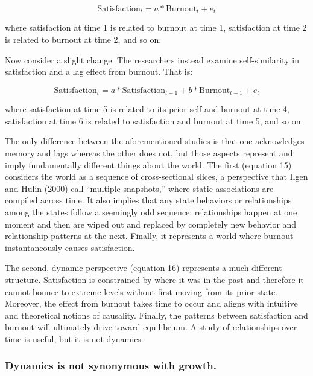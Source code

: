 \documentclass[english,,man]{apa6}
\begin{document}
\begin{equation}
\textrm{Satisfaction}_{t} = a * \textrm{Burnout}_{t} + e_{t}
\end{equation}

\noindent where satisfaction at time 1 is related to burnout at time 1, satisfaction at time 2 is related to burnout at time 2, and so on.

Now consider a slight change. The researchers instead examine self-similarity in satisfaction and a lag effect from burnout. That is:

\begin{equation}
\textrm{Satisfaction}_{t} = a * \textrm{Satisfaction}_{t - 1} + b * \textrm{Burnout}_{t - 1} + e_{t}
\end{equation}

\noindent where satisfaction at time 5 is related to its prior self and burnout at time 4, satisfaction at time 6 is related to satisfaction and burnout at time 5, and so on.

The only difference between the aforementioned studies is that one acknowledges memory and lags whereas the other does not, but those aspects represent and imply fundamentally different things about the world. The first (equation 15) considers the world as a sequence of cross-sectional slices, a perspective that Ilgen and Hulin (2000) call \enquote{multiple snapshots,} where static associations are compiled across time. It also implies that any state behaviors or relationships among the states follow a seemingly odd sequence: relationships happen at one moment and then are wiped out and replaced by completely new behavior and relationship patterns at the next. Finally, it represents a world where burnout instantaneously causes satisfaction.

The second, dynamic perspective (equation 16) represents a much different structure. Satisfaction is constrained by where it was in the past and therefore it cannot bounce to extreme levels without first moving from its prior state. Moreover, the effect from burnout takes time to occur and aligns with intuitive and theoretical notions of causality. Finally, the patterns between satisfaction and burnout will ultimately drive toward equilibrium. A study of relationships over time is useful, but it is not dynamics.

\hypertarget{dynamics-is-not-synonymous-with-growth.}{%
\subsubsection{Dynamics is not synonymous with growth.}\label{dynamics-is-not-synonymous-with-growth.}}
\end{document}
